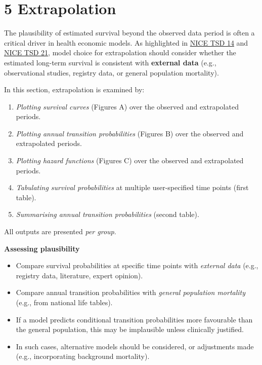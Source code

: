 \documentclass[
]{article}
\providecommand{\tightlist}{%
  \setlength{\itemsep}{0pt}\setlength{\parskip}{0pt}}
\begin{document}
\clearpage

\section{5 Extrapolation}\label{extrapolation}

The plausibility of estimated survival beyond the observed data period
is often a critical driver in health economic models. As highlighted in
\href{https://nicedsu.org.uk/wp-content/uploads/2016/03/NICE-DSU-TSD-Survival-analysis.updated-March-2013.v2.pdf}{NICE
TSD 14} and \href{https://www.sheffield.ac.uk/media/34188/download}{NICE
TSD 21}, model choice for extrapolation should consider whether the
estimated long-term survival is consistent with \textbf{external data}
(e.g., observational studies, registry data, or general population
mortality).

In this section, extrapolation is examined by:

\begin{enumerate}
\def\labelenumi{\arabic{enumi}.}
\tightlist
\item
  \emph{Plotting survival curves} (Figures A) over the observed and
  extrapolated periods.\\
\item
  \emph{Plotting annual transition probabilities} (Figures B) over the
  observed and extrapolated periods.
\item
  \emph{Plotting hazard functions} (Figures C) over the observed and
  extrapolated periods.
\item
  \emph{Tabulating survival probabilities} at multiple user-specified
  time points (first table).
\item
  \emph{Summarising annual transition probabilities} (second table).
\end{enumerate}

All outputs are presented \emph{per group}.

\textbf{Assessing plausibility}

\begin{itemize}
\tightlist
\item
  Compare survival probabilities at specific time points with
  \emph{external data} (e.g., registry data, literature, expert
  opinion).\\
\item
  Compare annual transition probabilities with \emph{general population
  mortality} (e.g., from national life tables).\\
\item
  If a model predicts conditional transition probabilities more
  favourable than the general population, this may be implausible unless
  clinically justified.\\
\item
  In such cases, alternative models should be considered, or adjustments
  made (e.g., incorporating background mortality).
\end{itemize}
\end{document}
